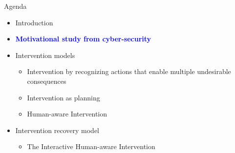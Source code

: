 \begin{frame}{Agenda}
\begin{itemize}
\item Introduction
\item \textcolor{blue} {\textbf{Motivational study from cyber-security}}
\item Intervention models
\begin{itemize}
\item Intervention by recognizing actions that enable multiple undesirable consequences
\item Intervention as planning
\item Human-aware Intervention
\end{itemize}
\item Intervention recovery model
\begin{itemize}
\item The Interactive Human-aware Intervention
\end{itemize}
\end{itemize}

\end{frame}